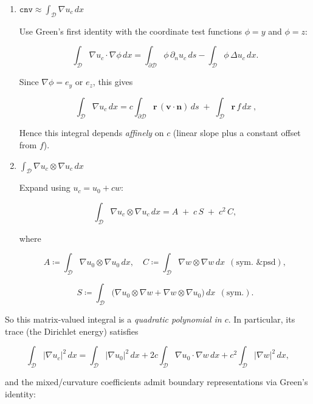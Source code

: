 \begin{enumerate}

\item $\displaystyle \mathtt{cnv} \approx \int_{\mathscr D}\nabla u_c\,dx$

Use Green’s first identity with the coordinate test functions $\phi=y$ and $\phi=z$:

$$
\int_{\mathscr D}\nabla u_c\cdot \nabla \phi\,dx
= \int_{\partial\mathscr D}\phi\,\partial_n u_c\,ds
  - \int_{\mathscr D}\phi\,\Delta u_c\,dx.
$$

Since $\nabla \phi=e_y$ or $e_z$, this gives 




$$
\boxed{\ \int_{\mathscr D}\nabla u_c\,dx
= c\int_{\partial\mathscr D} \bm{r}\,(\bm{v}\!\cdot \bm{n})\,ds\;+\;\int_{\mathscr D} \bm{r}\,f\,dx\ ,}
$$

Hence this integral depends \emph{affinely} on $c$ (linear slope plus a constant offset from $f$).

\item $\displaystyle \int_{\mathscr D}\nabla u_c\otimes \nabla u_c\,dx$

Expand using $u_c=u_0+c w$:

$$
\int_{\mathscr D}\nabla u_c\otimes \nabla u_c\,dx
= A \;+\; c\,S \;+\; c^2\,C,
$$

where

$$
A\coloneq\int_{\mathscr D}\nabla u_0\otimes\nabla u_0\,dx,\quad
C\coloneq\int_{\mathscr D}\nabla w\otimes\nabla w\,dx\ \ (\text{sym.\ \& psd}),
$$

$$
S\coloneq\int_{\mathscr D}\!\big(\nabla u_0\otimes\nabla w+\nabla w\otimes\nabla u_0\big)\,dx\ \ (\text{sym.}).
$$
\end{enumerate}


So this matrix-valued integral is a \emph{quadratic polynomial in $c$}. 
In particular, its trace (the Dirichlet energy) satisfies

$$
\int_{\mathscr D}|\nabla u_c|^2\,dx
= \int_{\mathscr D}|\nabla u_0|^2\,dx
+ 2c\int_{\mathscr D}\nabla u_0\cdot \nabla w\,dx
+ c^2\int_{\mathscr D}|\nabla w|^2\,dx,
$$

and the mixed/curvature coefficients admit boundary representations via Green’s identity:

